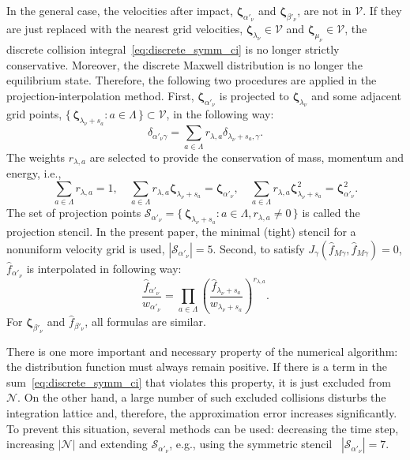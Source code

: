 \documentclass[aip,pof,preprint]{revtex4-1}
\newcommand{\bzeta}{\boldsymbol{\zeta}}
\newcommand{\Set}[2]{\{\,{#1}:{#2}\,\}}
\begin{document}
In the general case, the velocities after impact,
\(\bzeta_{\alpha'_\nu}\) and \(\bzeta_{\beta'_\nu}\), are not in \(\mathcal{V}\).
If they are just replaced with the nearest grid velocities,
\(\bzeta_{\lambda_\nu}\in\mathcal{V}\) and \(\bzeta_{\mu_\nu}\in\mathcal{V}\),
the discrete collision integral~\eqref{eq:discrete_symm_ci} is no longer strictly conservative.
Moreover, the discrete Maxwell distribution is no longer the equilibrium state.
Therefore, the following two procedures are applied in the projection-interpolation method.
First, \(\bzeta_{\alpha'_\nu}\) is projected to \(\bzeta_{\lambda_\nu}\) and
some adjacent grid points, \(\Set{\bzeta_{\lambda_\nu+s_a}}{a\in\Lambda}\subset\mathcal{V}\),
in the following way:
\begin{equation}\label{eq:ci_projection}
    \delta_{\alpha'_\nu\gamma} = \sum_{a\in\Lambda} r_{\lambda,a}\delta_{\lambda_\nu+s_a,\gamma}.
\end{equation}
The weights \(r_{\lambda,a}\) are selected to provide the conservation of mass, momentum and energy, i.e.,
\begin{equation}\label{eq:impact_conservation}
    \sum_{a\in\Lambda} r_{\lambda,a} = 1, \quad
    \sum_{a\in\Lambda} r_{\lambda,a} \bzeta_{\lambda_\nu+s_a} = \bzeta_{\alpha'_\nu}, \quad
    \sum_{a\in\Lambda} r_{\lambda,a} \bzeta_{\lambda_\nu+s_a}^2 = \bzeta_{\alpha'_\nu}^2.
\end{equation}
The set of projection points \(\mathcal{S}_{\alpha'_\nu} = \Set{\bzeta_{\lambda_\nu+s_a}}{a\in\Lambda, r_{\lambda,a}\neq0}\)
is called the projection stencil.
In the present paper, the minimal (tight) stencil for a nonuniform velocity grid is used, \(|\mathcal{S}_{\alpha'_\nu}|=5\).
Second, to satisfy \(J_\gamma(\hat{f}_{M\gamma}, \hat{f}_{M\gamma}) = 0\),
\(\hat{f}_{\alpha'_\nu}\) is interpolated in following way:
\begin{equation}\label{eq:ci_interpolation}
    \frac{\hat{f}_{\alpha'_\nu}}{w_{\alpha'_\nu}} = \prod_{a\in\Lambda}
        \left(\frac{\hat{f}_{\lambda_\nu+s_a}}{w_{\lambda_\nu+s_a}} \right)^{r_{\lambda,a}}.
\end{equation}
For \(\bzeta_{\beta'_\nu}\) and \(\hat{f}_{\beta'_\nu}\), all formulas are similar.

There is one more important and necessary property of the numerical algorithm:
the distribution function must always remain positive.
If there is a term in the sum~\eqref{eq:discrete_symm_ci} that violates this property,
it is just excluded from \(\mathcal{N}\).
On the other hand, a large number of such excluded collisions disturbs the integration lattice
and, therefore, the approximation error increases significantly.
To prevent this situation, several methods can be used:
decreasing the time step, increasing \(|\mathcal{N}|\) and extending \(\mathcal{S}_{\alpha'_\nu}\),
e.g., using the symmetric stencil~\cite{Dodulad2015} \(|\mathcal{S}_{\alpha'_\nu}|=7\).
\end{document}
